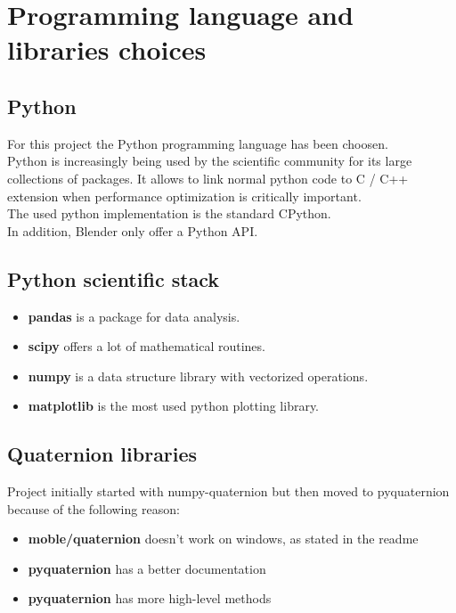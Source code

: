 \chapter{Programming language and libraries choices}
\label{chap:programming_language_libraries_choices}

\section{Python}
For this project the Python programming language \cite{python-website} has been choosen. \\
Python is increasingly being used by the scientific community for its large collections of packages. It allows to link normal python code to C / C++ extension when performance optimization is critically important. \\
The used python implementation is the standard CPython. \\
In addition, Blender only offer a Python API.

\section{Python scientific stack}
\begin{itemize}
	\item \textbf{pandas} is a package for data analysis.
	\item \textbf{scipy} offers a lot of mathematical routines.
	\item \textbf{numpy} is a data structure library with vectorized operations. %
	\item \textbf{matplotlib} is the most used python plotting library.
\end{itemize}

\section{Quaternion libraries}

Project initially started with numpy-quaternion \cite{numpy-quaternion} but then moved to pyquaternion \cite{pyquaternion} because of the following reason:
\begin{itemize}
\item \textbf{moble/quaternion} doesn't work on windows, as stated in the readme
\item \textbf{pyquaternion} has a better documentation
\item \textbf{pyquaternion} has more high-level methods
\end{itemize}

